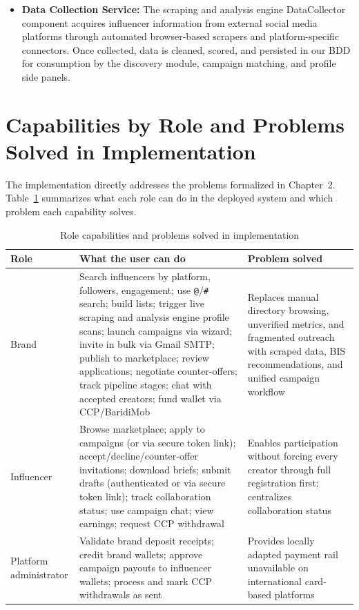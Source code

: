 \begin{itemize}
    \item \textbf{Data Collection Service:} The scraping and analysis engine DataCollector component acquires influencer information from external social media platforms through automated browser-based scrapers and platform-specific connectors. Once collected, data is cleaned, scored, and persisted in our BDD for consumption by the discovery module, campaign matching, and profile side panels.
\end{itemize}
\section{Capabilities by Role and Problems Solved in Implementation}

The implementation directly addresses the problems formalized in Chapter~2. Table~\ref{tab:impl_capabilities} summarizes what each role can do in the deployed system and which problem each capability solves.

\begin{table}[H]
\centering
\setpurpletable
\renewcommand{\arraystretch}{1.4}
\caption{Role capabilities and problems solved in implementation}
\label{tab:impl_capabilities}
\begin{tabularx}{\textwidth}{|>{\raggedright\arraybackslash}p{2.2cm}|>{\raggedright\arraybackslash}X|>{\raggedright\arraybackslash}X|}
\hline
\textbf{Role} & \textbf{What the user can do} & \textbf{Problem solved} \\
\hline
Brand & Search influencers by platform, followers, engagement; use \texttt{@}/\texttt{\#} search; build lists; trigger live scraping and analysis engine profile scans; launch campaigns via wizard; invite in bulk via Gmail SMTP; publish to marketplace; review applications; negotiate counter-offers; track pipeline stages; chat with accepted creators; fund wallet via CCP/BaridiMob & Replaces manual directory browsing, unverified metrics, and fragmented outreach with scraped data, BIS recommendations, and unified campaign workflow \\
\hline
Influencer & Browse marketplace; apply to campaigns (or via secure token link); accept/decline/counter-offer invitations; download briefs; submit drafts (authenticated or via secure token link); track collaboration status; use campaign chat; view earnings; request CCP withdrawal & Enables participation without forcing every creator through full registration first; centralizes collaboration status \\
\hline
Platform administrator & Validate brand deposit receipts; credit brand wallets; approve campaign payouts to influencer wallets; process and mark CCP withdrawals as sent & Provides locally adapted payment rail unavailable on international card-based platforms \\
\hline
\end{tabularx}
\end{table}

